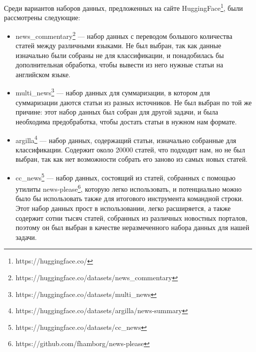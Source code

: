 \documentclass[conference]{IEEEtran}
\begin{document}
Среди вариантов наборов данных, предложенных на сайте HuggingFace\footnote{https://huggingface.co/}, были рассмотрены следующие:
\begin{itemize}
    \item news\_commentary\footnote{https://huggingface.co/datasets/news\_commentary} --- набор данных с переводом большого количества статей между различными языками. Не был выбран, так как данные изначально были собраны не для классификации, и понадобилась бы дополнительная обработка, чтобы вывести из него нужные статьи на английском языке.
    \item multi\_news\footnote{https://huggingface.co/datasets/multi\_news} --- набор данных для суммаризации, в котором для суммаризации даются статьи из разных источников. Не был выбран по той же причине: этот набор данных был собран для другой задачи, и была необходима предобработка, чтобы достать статьи в нужном нам формате.
    \item argilla\footnote{https://huggingface.co/datasets/argilla/news-summary} --- набор данных, содержащий статьи, изначально собранные для классификации. Содержит около 20000 статей, что подходит нам, но не был выбран, так как нет возможности собрать его заново из самых новых статей.
    \item cc\_news\footnote{https://huggingface.co/datasets/cc\_news} --- набор данных, состоящий из статей, собранных с помощью утилиты news-please\footnote{https://github.com/fhamborg/news-please}, которую легко использовать, и потенциально можно было бы использовать также для итогового инструмента командной строки. Этот набор данных прост в использовании, легко расширяется, а также содержит сотни тысяч статей, собранных из различных новостных порталов, поэтому он был выбран в качестве неразмеченного набора данных для нашей задачи.
\end{itemize}
\end{document}
